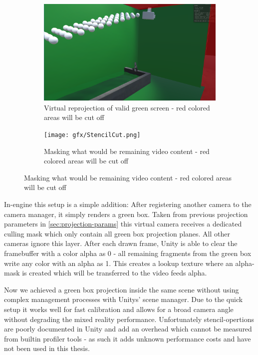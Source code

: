 \begin{figure}[htbp]
	\caption{Virtual projection and photo of VR actor - note: in-engine 
	screenshot and photos were taken shortly apart and therefore don't fit 
	exactly}
	\label{fig:stencil:projection}
	\begin{subfigure}[t]{.45\textwidth}
		\centering
		\includegraphics[width=\textwidth]{gfx/StencilProjection.png}
		\caption{Virtual reprojection of valid green screen - red colored areas 
		will be cut off}
	\end{subfigure}
	\begin{subfigure}[t]{.45\textwidth}
		\centering
		\texttt{[image: gfx/StencilCut.png]}
		\caption{Masking what would be remaining video content - red colored 
		areas will be cut off}
	\end{subfigure}
\end{figure}

In-engine this setup is a simple addition: After registering another camera to 
the camera manager, it simply renders a green box. Taken from previous 
projection parameters in \ref{sec:projection-params} this virtual camera 
receives a dedicated culling mask which only contain all green box projection 
planes. All other cameras ignore this layer. After each drawn frame, Unity is 
able to clear the framebuffer with a color alpha as 0 - all remaining fragments 
from the green box write any color with an alpha as 1. This creates a lookup 
texture where an alpha-mask is created which will be transferred to the video 
feeds alpha.

Now we achieved a green box projection inside the same scene without using 
complex management processes with Unitys' scene manager. Due to the quick setup 
it works well for fast calibration and allows for a broad camera angle without 
degrading the mixed reality performance.
\newline
Unfortunately stencil-opertions are poorly documented in Unity and add an 
overhead which cannot be measured from builtin profiler tools - as such it adds 
unknown performance costs and have not been used in this thesis.